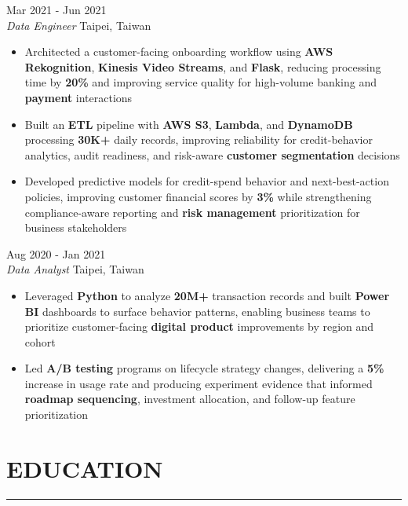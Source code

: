 \documentclass[11pt,letterpaper]{article}
\begin{document}
\vspace{4pt}
 \hfill Mar 2021 - Jun 2021\\[-1pt]
\textit{Data Engineer} \hfill Taipei, Taiwan
\begin{itemize}[leftmargin=1.5em, rightmargin=0pt, itemsep=-1pt, topsep=-1pt, parsep=0pt]
  \item \justifying Architected a customer-facing onboarding workflow using \textbf{AWS Rekognition}, \textbf{Kinesis Video Streams}, and \textbf{Flask}, reducing processing time by \textbf{20\%} and improving service quality for high-volume banking and \textbf{payment} interactions
  \item \justifying Built an \textbf{ETL} pipeline with \textbf{AWS S3}, \textbf{Lambda}, and \textbf{DynamoDB} processing \textbf{30K+} daily records, improving reliability for credit-behavior analytics, audit readiness, and risk-aware \textbf{customer segmentation} decisions
  \item \justifying Developed predictive models for credit-spend behavior and next-best-action policies, improving customer financial scores by \textbf{3\%} while strengthening compliance-aware reporting and \textbf{risk management} prioritization for business stakeholders
\end{itemize}

\vspace{4pt}
 \hfill Aug 2020 - Jan 2021\\[-1pt]
\textit{Data Analyst} \hfill Taipei, Taiwan
\begin{itemize}[leftmargin=1.5em, rightmargin=0pt, itemsep=-1pt, topsep=-1pt, parsep=0pt]
  \item \justifying Leveraged \textbf{Python} to analyze \textbf{20M+} transaction records and built \textbf{Power BI} dashboards to surface behavior patterns, enabling business teams to prioritize customer-facing \textbf{digital product} improvements by region and cohort
  \item \justifying Led \textbf{A/B testing} programs on lifecycle strategy changes, delivering a \textbf{5\%} increase in usage rate and producing experiment evidence that informed \textbf{roadmap sequencing}, investment allocation, and follow-up feature prioritization
\end{itemize}

\vspace{4pt}
\section*{EDUCATION}
\vspace{-6pt}\noindent\rule{\textwidth}{0.8pt}
\end{document}
